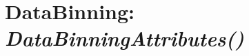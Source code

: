 \documentclass[letterpaper,10pt,english]{sphinxmanual}
\begin{document}
\begin{DUlineblock}{0em}
\item[] 
\end{DUlineblock}

\begin{DUlineblock}{0em}
\item[] 
\end{DUlineblock}


\section{\textbf{DataBinning}: \emph{DataBinningAttributes()}}
\label{attributes:databinning-databinningattributes}
\begin{DUlineblock}{0em}
\item[] 
\end{DUlineblock}
\end{document}
